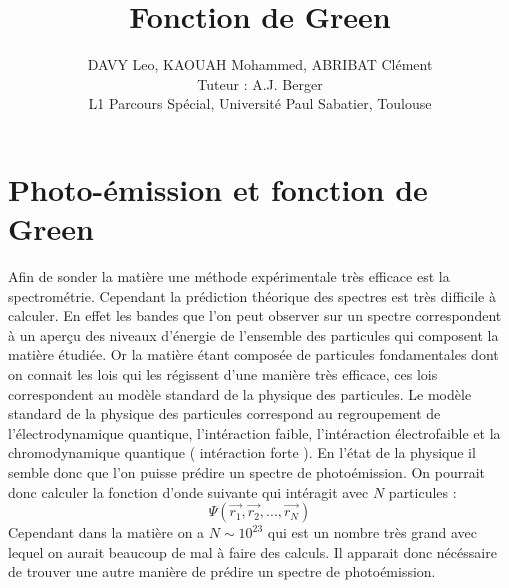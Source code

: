 \documentclass[12pt]{article}
\title{Fonction de Green}
\author{DAVY Leo, KAOUAH Mohammed, ABRIBAT Cl\'ement\\ 
Tuteur : A.J. Berger\\
\small L1 Parcours Sp\'ecial, Universit\'e Paul Sabatier, Toulouse}
\begin{document}
\maketitle
\section{Photo-\'emission et fonction de Green}

Afin de sonder la mati\`ere une m\'ethode exp\'erimentale tr\`es efficace est la spectrom\'etrie.
Cependant la pr\'ediction th\'eorique des spectres est tr\`es difficile \`a calculer. En effet
 les bandes que l'on peut observer sur un spectre correspondent \`a un aper\c cu des niveaux d'\'energie de 
 l'ensemble des particules qui composent la mati\`ere \'etudi\'ee. Or la mati\`ere \'etant compos\'ee de particules fondamentales
  dont on connait les lois qui les r\'egissent d'une mani\`ere tr\`es efficace, ces lois correspondent au mod\`ele standard de la physique des particules.
  Le mod\`ele standard de la physique des particules correspond au regroupement de l'\'electrodynamique quantique, l'int\'eraction faible,
   l'int\'eraction \'electrofaible et la chromodynamique quantique ( int\'eraction forte ).
   \newline
   En l'\'etat de la physique il semble donc que l'on puisse pr\'edire un spectre de photo\'emission. 
   On pourrait donc calculer la fonction d'onde suivante qui int\'eragit avec $N$ particules :
   \begin{equation}
    \Psi(\vec{r_1}, \vec{r_2}, ..., \vec{r_N})
   \end{equation}
    Cependant dans la mati\`ere on a $N \sim 10^{23}$ qui est un nombre tr\`es grand avec lequel on aurait beaucoup de mal
    \`a faire des calculs. Il apparait donc n\'ec\'essaire de trouver une autre mani\`ere de pr\'edire un spectre de photo\'emission.
\end{document}
